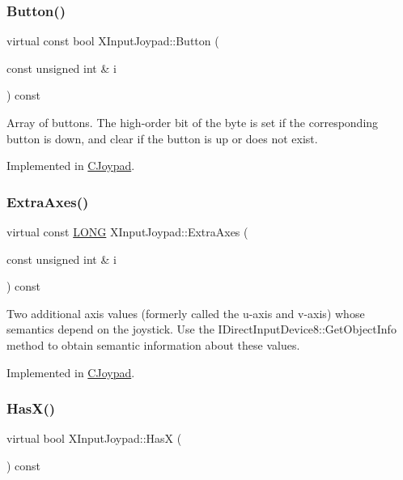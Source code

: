 \subsubsection{\texorpdfstring{Button()}{Button()}}
{\footnotesize\ttfamily virtual const bool X\+Input\+Joypad\+::\+Button (\begin{DoxyParamCaption}\item[{const unsigned int \&}]{i }\end{DoxyParamCaption}) const\hspace{0.3cm}{\ttfamily [pure virtual]}}

Array of buttons. The high-\/order bit of the byte is set if the corresponding button is down, and clear if the button is up or does not exist. 

Implemented in \hyperlink{class_c_joypad_a0125d648a2866c9524e70e3ddeb8b675}{C\+Joypad}.

\mbox{\label{struct_x_input_joypad_a074ad76f1e54b559fcee6606049bb6b7}} 
\subsubsection{\texorpdfstring{Extra\+Axes()}{ExtraAxes()}}
{\footnotesize\ttfamily virtual const \hyperlink{_joypad_8h_a2a3e0cda5f1249bef6db47c5eb8e3813}{L\+O\+NG} X\+Input\+Joypad\+::\+Extra\+Axes (\begin{DoxyParamCaption}\item[{const unsigned int \&}]{i }\end{DoxyParamCaption}) const\hspace{0.3cm}{\ttfamily [pure virtual]}}

Two additional axis values (formerly called the u-\/axis and v-\/axis) whose semantics depend on the joystick. Use the I\+Direct\+Input\+Device8\+::\+Get\+Object\+Info method to obtain semantic information about these values. 

Implemented in \hyperlink{class_c_joypad_ac94bd5a534d97f4c82456397e9a01b1c}{C\+Joypad}.

\mbox{\label{struct_x_input_joypad_a9b5317808345c53bc0df5a3054dd0318}} 
\subsubsection{\texorpdfstring{Has\+X()}{HasX()}}
{\footnotesize\ttfamily virtual bool X\+Input\+Joypad\+::\+HasX (\begin{DoxyParamCaption}{ }\end{DoxyParamCaption}) const\hspace{0.3cm}{\ttfamily [pure virtual]}}

